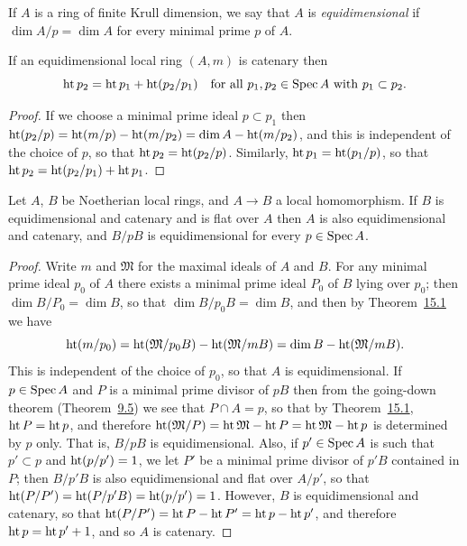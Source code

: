 If $A$ is a ring of finite Krull dimension, we say that $A$ is \emph{equidimensional} if
$\dim A/p = \dim A$ for every minimal prime $p$ of $A$.

\begin{lemma}\label{lem:31.2}
If an equidimensional local ring $(A, m)$ is catenary then
\[
  \operatorname{ht} p_2 = \operatorname{ht} p_1 + \operatorname{ht}(p_2/p_1) \quad \text{for all } p_1, p_2 \in \operatorname{Spec} A
      \text{ with } p_1 \subset p_2.
\]
\end{lemma}

\begin{proof}
If we choose a minimal prime ideal $p \subset p_1$ then
$\operatorname{ht}(p_2/p) = \operatorname{ht}(m/p) - \operatorname{ht}(m/p_2) = \dim A - \operatorname{ht}(m/p_2)$, and this is independent
of the choice of $p$, so that $\operatorname{ht} p_2 = \operatorname{ht}(p_2/p)$. Similarly,
$\operatorname{ht} p_1 = \operatorname{ht}(p_1/p)$, so that $\operatorname{ht} p_2 = \operatorname{ht}(p_2/p_1) + \operatorname{ht} p_1$.
\end{proof}

\begin{theorem}\label{thm:31.5}
Let $A$, $B$ be Noetherian local rings, and $A \to B$ a local homomorphism. If $B$ is
equidimensional and catenary and is flat over $A$ then $A$ is also
equidimensional and catenary, and $B/pB$ is equidimensional for every
$p \in \operatorname{Spec} A$.
\end{theorem}

\begin{proof}
Write $m$ and $\mathfrak{M}$ for the maximal ideals of $A$ and $B$. For any minimal prime ideal
$p_0$ of $A$ there exists a minimal prime ideal $P_0$ of $B$ lying over $p_0$; then
$\dim B/P_0 = \dim B$, so that $\dim B/p_0B = \dim B$, and then by
Theorem~\hyperref[thm:15.1]{15.1} we have
\[
  \operatorname{ht}(m/p_0) = \operatorname{ht}(\mathfrak{M}/p_0B) - \operatorname{ht}(\mathfrak{M}/mB) = \dim B - \operatorname{ht}(\mathfrak{M}/mB).
\]
This is independent of the choice of $p_0$, so that $A$ is equidimensional. If
$p \in \operatorname{Spec} A$ and $P$ is a minimal prime divisor of $pB$ then from the going-down
theorem (Theorem~\hyperref[thm:9.5]{9.5}) we see that $P \cap A = p$, so that by
Theorem~\hyperref[thm:15.1]{15.1}, $\operatorname{ht} P = \operatorname{ht} p$, and therefore
$\operatorname{ht}(\mathfrak{M}/P) = \operatorname{ht} \mathfrak{M} - \operatorname{ht} P = \operatorname{ht} \mathfrak{M} - \operatorname{ht} p$ is determined by $p$ only. That
is, $B/pB$ is equidimensional. Also, if $p' \in \operatorname{Spec} A$ is such that $p' \subset p$ and
$\operatorname{ht}(p/p') = 1$, we let $P'$ be a minimal prime divisor of $p'B$ contained in $P$;
then $B/p'B$ is also equidimensional and flat over $A/p'$, so that
$\operatorname{ht}(P/P') = \operatorname{ht}(P/p'B) = \operatorname{ht}(p/p') = 1$. However, $B$ is equidimensional and
catenary, so that $\operatorname{ht}(P/P') = \operatorname{ht} P - \operatorname{ht} P' = \operatorname{ht} p - \operatorname{ht} p'$, and therefore
$\operatorname{ht} p = \operatorname{ht} p' + 1$, and so $A$ is catenary.
\end{proof}


